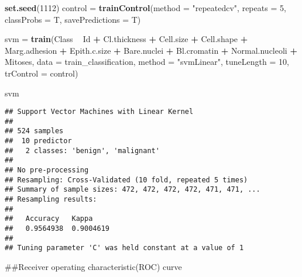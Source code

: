 \documentclass[]{article}
\newenvironment{Shaded}{\begin{snugshade}}{\end{snugshade}}
\newcommand{\DataTypeTok}[1]{\textcolor[rgb]{0.13,0.29,0.53}{#1}}
\newcommand{\DecValTok}[1]{\textcolor[rgb]{0.00,0.00,0.81}{#1}}
\newcommand{\KeywordTok}[1]{\textcolor[rgb]{0.13,0.29,0.53}{\textbf{#1}}}
\newcommand{\NormalTok}[1]{#1}
\newcommand{\OperatorTok}[1]{\textcolor[rgb]{0.81,0.36,0.00}{\textbf{#1}}}
\newcommand{\StringTok}[1]{\textcolor[rgb]{0.31,0.60,0.02}{#1}}
\begin{document}
\begin{Shaded}
\begin{Highlighting}[]
\KeywordTok{set.seed}\NormalTok{(}\DecValTok{1112}\NormalTok{)}
\NormalTok{control =}\StringTok{ }\KeywordTok{trainControl}\NormalTok{(}\DataTypeTok{method =} \StringTok{"repeatedcv"}\NormalTok{, }\DataTypeTok{repeats =} \DecValTok{5}\NormalTok{, }\DataTypeTok{classProbs =}\NormalTok{ T, }\DataTypeTok{savePredictions =}\NormalTok{ T)}

\NormalTok{svm =}\StringTok{ }\KeywordTok{train}\NormalTok{(Class }\OperatorTok{~}\StringTok{ }\NormalTok{Id }\OperatorTok{+}\StringTok{ }\NormalTok{Cl.thickness }\OperatorTok{+}\StringTok{ }\NormalTok{Cell.size }\OperatorTok{+}\StringTok{ }\NormalTok{Cell.shape }\OperatorTok{+}\StringTok{ }\NormalTok{Marg.adhesion }\OperatorTok{+}\StringTok{ }\NormalTok{Epith.c.size }\OperatorTok{+}\StringTok{ }\NormalTok{Bare.nuclei }\OperatorTok{+}\StringTok{ }\NormalTok{Bl.cromatin }\OperatorTok{+}\StringTok{ }\NormalTok{Normal.nucleoli }\OperatorTok{+}\StringTok{  }\NormalTok{Mitoses,  }\DataTypeTok{data =}\NormalTok{ train_classification, }\DataTypeTok{method =} \StringTok{"svmLinear"}\NormalTok{, }\DataTypeTok{tuneLength =} \DecValTok{10}\NormalTok{, }\DataTypeTok{trControl =}\NormalTok{ control)}

\NormalTok{svm}
\end{Highlighting}
\end{Shaded}

\begin{verbatim}
## Support Vector Machines with Linear Kernel 
## 
## 524 samples
##  10 predictor
##   2 classes: 'benign', 'malignant' 
## 
## No pre-processing
## Resampling: Cross-Validated (10 fold, repeated 5 times) 
## Summary of sample sizes: 472, 472, 472, 472, 471, 471, ... 
## Resampling results:
## 
##   Accuracy   Kappa    
##   0.9564938  0.9004619
## 
## Tuning parameter 'C' was held constant at a value of 1
\end{verbatim}

\#\#Receiver operating characteristic(ROC) curve

\begin{Shaded}
\end{Shaded}
\end{document}
